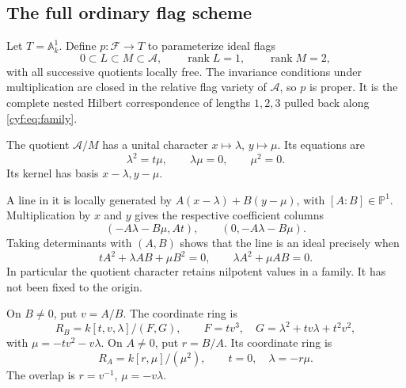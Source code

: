 \subsection{The full ordinary flag scheme}

Let \(T=\mathbb A_k^1\). Define \(p:\mathscr F\to T\)
to parameterize ideal flags
\[
 0\subset L\subset M\subset\mathcal A,
 \qquad\operatorname{rank}L=1,
 \qquad\operatorname{rank}M=2,
\]
with all successive quotients locally free. The invariance
conditions under multiplication are closed in the relative
flag variety of \(\mathcal A\), so \(p\) is proper.
It is the complete nested Hilbert correspondence of lengths
\(1,2,3\) pulled back along \eqref{cyf:eq:family}.

The quotient \(\mathcal A/M\) has a unital character
\(x\mapsto\lambda\), \(y\mapsto\mu\). Its equations are
\begin{equation}\label{cyf:eq:character}
                  \lambda^2=t\mu,\qquad
                  \lambda\mu=0,\qquad\mu^2=0.
\end{equation}
Its kernel has basis \(x-\lambda,y-\mu\).

A line in it is locally generated by
\(A(x-\lambda)+B(y-\mu)\), with \([A:B]\in\mathbb P^1\).
Multiplication by \(x\) and \(y\) gives the respective
coefficient columns
\[
                (-A\lambda-B\mu,At),\qquad
                (0,-A\lambda-B\mu).
\]
Taking determinants with \((A,B)\) shows that the line is
an ideal precisely when
\begin{equation}\label{cyf:eq:line}
 tA^2+\lambda AB+\mu B^2=0,
 \qquad \lambda A^2+\mu AB=0.
\end{equation}
In particular the quotient character retains nilpotent
values in a family. It has not been fixed to the origin.

\begin{theorem}\label{cyf:thm:flags}
On \(B\ne0\), put \(v=A/B\). The coordinate ring is
\begin{equation}\label{cyf:eq:B-chart}
 R_B=k[t,v,\lambda]/(F,G),\qquad
 F=tv^3,\quad G=\lambda^2+tv\lambda+t^2v^2,
\end{equation}
with \(\mu=-tv^2-v\lambda\). On \(A\ne0\), put
\(r=B/A\). Its coordinate ring is
\begin{equation}\label{cyf:eq:A-chart}
 R_A=k[r,\mu]/(\mu^2),\qquad
                      t=0,\quad\lambda=-r\mu.
\end{equation}
The overlap is \(r=v^{-1}\), \(\mu=-v\lambda\).
\end{theorem}

